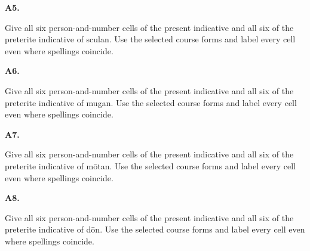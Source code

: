 \par\begin{minipage}{\linewidth}\raggedright
\textbf{A5.}

Give all six person-and-number cells of the present indicative and all six of the preterite indicative of sculan. Use the selected course forms and label every cell even where spellings coincide.

\end{minipage}\par\addvspace{4pt}

\par\begin{minipage}{\linewidth}\raggedright
\textbf{A6.}

Give all six person-and-number cells of the present indicative and all six of the preterite indicative of mugan. Use the selected course forms and label every cell even where spellings coincide.

\end{minipage}\par\addvspace{4pt}

\par\begin{minipage}{\linewidth}\raggedright
\textbf{A7.}

Give all six person-and-number cells of the present indicative and all six of the preterite indicative of mōtan. Use the selected course forms and label every cell even where spellings coincide.

\end{minipage}\par\addvspace{4pt}

\par\begin{minipage}{\linewidth}\raggedright
\textbf{A8.}

Give all six person-and-number cells of the present indicative and all six of the preterite indicative of dōn. Use the selected course forms and label every cell even where spellings coincide.

\end{minipage}\par\addvspace{4pt}

